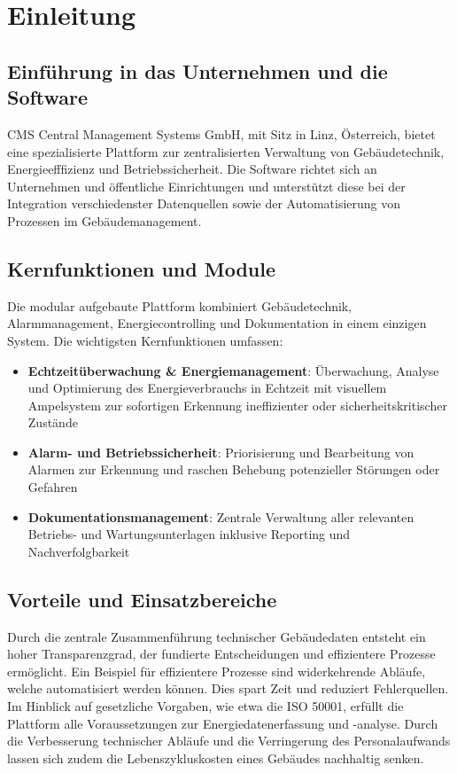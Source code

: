 \section{Einleitung}
\subsection{Einführung in das Unternehmen und die Software}

CMS Central Management Systems GmbH, mit Sitz in Linz, Österreich, bietet eine spezialisierte Plattform zur zentralisierten Verwaltung von Gebäudetechnik, Energieefffizienz und Betriebssicherheit. Die Software richtet sich an Unternehmen und öffentliche Einrichtungen und unterstützt diese bei der Integration verschiedenster Datenquellen sowie der Automatisierung von Prozessen im Gebäudemanagement.

\subsection{Kernfunktionen und Module}

Die modular aufgebaute Plattform kombiniert Gebäudetechnik, Alarmmanagement, Energiecontrolling und Dokumentation in einem einzigen System. Die wichtigsten Kernfunktionen umfassen:
\begin{itemize}
    \item \textbf{Echtzeitüberwachung \& Energiemanagement}: Überwachung, Analyse und Optimierung des Energieverbrauchs in Echtzeit mit visuellem Ampelsystem zur sofortigen Erkennung ineffizienter oder sicherheitskritischer Zustände
    \item \textbf{Alarm- und Betriebssicherheit}: Priorisierung und Bearbeitung von Alarmen zur Erkennung und raschen Behebung potenzieller Störungen oder Gefahren
    \item \textbf{Dokumentationsmanagement}: Zentrale Verwaltung aller relevanten Betriebs- und Wartungsunterlagen inklusive Reporting und Nachverfolgbarkeit
\end{itemize}

\subsection{Vorteile und Einsatzbereiche}

Durch die zentrale Zusammenführung technischer Gebäudedaten entsteht ein hoher Transparenzgrad, der fundierte Entscheidungen und effizientere Prozesse ermöglicht. Ein Beispiel für effizientere Prozesse sind widerkehrende Abläufe, welche automatisiert werden können. Dies spart Zeit und reduziert Fehlerquellen. Im Hinblick auf gesetzliche Vorgaben, wie etwa die ISO 50001, erfüllt die Plattform alle Voraussetzungen zur Energiedatenerfassung und -analyse. Durch die Verbesserung technischer Abläufe und die Verringerung des Personalaufwands lassen sich zudem die Lebenszykluskosten eines Gebäudes nachhaltig senken.

